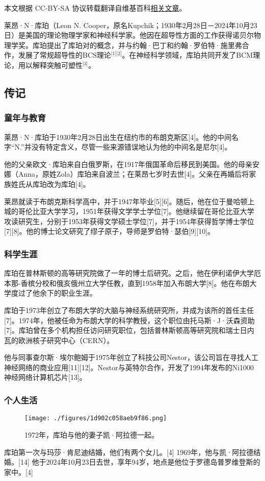
本文根据 CC-BY-SA 协议转载翻译自维基百科\href{https://en.wikipedia.org/wiki/Leon_Cooper}{相关文章}。

莱昂·N·库珀（Leon N. Cooper，原名Kupchik；1930年2月28日－2024年10月23日）是美国的理论物理学家和神经科学家。他因在超导性方面的工作获得诺贝尔物理学奖。库珀提出了库珀对的概念，并与约翰·巴丁和约翰·罗伯特·施里弗合作，发展了常规超导性的BCS理论\(^\text{[1][2]}\)。在神经科学领域，库珀共同开发了BCM理论，用以解释突触可塑性\(^\text{[3]}\)。
\subsection{传记}
\subsubsection{童年与教育}
莱昂·N·库珀于1930年2月28日出生在纽约市的布朗克斯区[4]。他的中间名字“N.”并没有特定含义，尽管一些来源错误地认为他的中间名是尼尔[4]。

他的父亲欧文·库珀来自白俄罗斯，在1917年俄国革命后移民到美国。他的母亲安娜（Anna，原姓Zola）库珀来自波兰；在莱昂七岁时去世[4]。父亲在再婚后将家族姓氏从库珀改为库珀[4]。

莱昂就读于布朗克斯科学高中，并于1947年毕业[5][6]。随后，他在位于曼哈顿上城的哥伦比亚大学学习，1951年获得文学学士学位[7]。他继续留在哥伦比亚大学攻读研究生，分别于1953年获得文学硕士学位[7]，并于1954年获得哲学博士学位[7][8]。他的博士论文研究了缪子原子，导师是罗伯特·瑟伯[9][10]。
\subsubsection{科学生涯}
库珀在普林斯顿的高等研究院做了一年的博士后研究。之后，他在伊利诺伊大学厄本那-香槟分校和俄亥俄州立大学任教，直到1958年加入布朗大学[8]。他在布朗大学度过了他余下的职业生涯。

库珀于1973年创立了布朗大学的大脑与神经系统研究所，并成为该所的首任主任[7]。1974年，他被任命为布朗大学的科学教授，这个职位由托马斯·J·沃森资助[7]。库珀曾在多个机构担任访问研究职位，包括普林斯顿高等研究院和瑞士日内瓦的欧洲核子研究中心（CERN）。

他与同事查尔斯·埃尔鲍姆于1975年创立了科技公司Nestor，该公司旨在寻找人工神经网络的商业应用[11][12]。Nestor与英特尔合作，开发了1994年发布的Ni1000神经网络计算机芯片[13]。
\subsubsection{个人生活}
\begin{figure}[ht]
\centering
\texttt{[image: ./figures/1d902c058aeb9f86.png]}
\caption{1972年，库珀与他的妻子凯·阿拉德一起。} \label{fig_LAkb_1}
\end{figure}
库珀第一次与玛莎·肯尼迪结婚，他们有两个女儿。[4] 1969年，他与凯·阿拉德结婚。[14] 他于2024年10月23日去世，享年94岁，地点是他位于罗德岛普罗维登斯的家中。[4]
